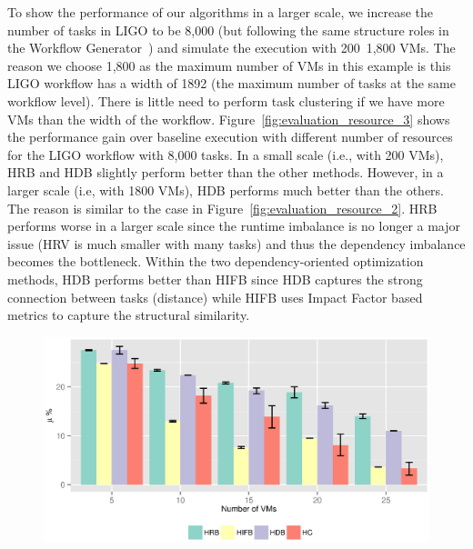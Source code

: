 To show the performance of our algorithms in a larger scale, we increase the number of tasks in LIGO to be 8,000 (but following the same structure roles in the Workflow Generator~\cite{WorkflowGenerator}) and simulate the execution with 200~1,800 VMs. The reason we choose 1,800 as the maximum number of VMs in this example is this LIGO workflow has a width of 1892 (the maximum number of tasks at the same workflow level). There is little need to perform task clustering if we have more VMs than the width of the workflow. Figure~\ref{fig:evaluation_resource_3} shows the performance gain over baseline execution with different number of resources for the LIGO workflow with 8,000 tasks. In a small scale (i.e., with 200 VMs), HRB and HDB slightly perform better than the other methods. However, in a larger scale (i.e, with 1800 VMs), HDB performs much better than the others. The reason is similar to the case in Figure~\ref{fig:evaluation_resource_2}. HRB performs worse in a larger scale since the runtime imbalance is no longer a major issue (HRV is much smaller with many tasks) and thus the dependency imbalance becomes the bottleneck. Within the two dependency-oriented optimization methods, HDB performs better than HIFB since HDB captures the strong connection between tasks (distance) while HIFB uses Impact Factor based metrics to capture the structural similarity. 

\begin{figure}[!htb]
	\centering
	\includegraphics[width=1.0\linewidth]{figure22.eps}
	\label{fig:evaluation_resource_1}
\end{figure}

